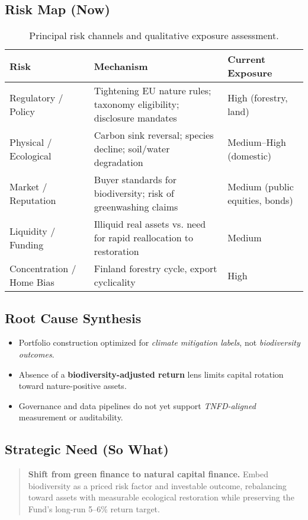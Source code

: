 \subsection*{Risk Map (Now)}
\begin{table}[h!]
\centering
\begin{tabular}{p{3.3cm} p{6.6cm} p{3.3cm}}
\toprule
\textbf{Risk} & \textbf{Mechanism} & \textbf{Current Exposure} \\
\midrule
Regulatory / Policy & Tightening EU nature rules; taxonomy eligibility; disclosure mandates & High (forestry, land) \\
Physical / Ecological & Carbon sink reversal; species decline; soil/water degradation & Medium–High (domestic) \\
Market / Reputation & Buyer standards for biodiversity; risk of greenwashing claims & Medium (public equities, bonds) \\
Liquidity / Funding & Illiquid real assets vs. need for rapid reallocation to restoration & Medium \\
Concentration / Home Bias & Finland forestry cycle, export cyclicality & High \\
\bottomrule
\end{tabular}
\caption{Principal risk channels and qualitative exposure assessment.}
\end{table}

\subsection*{Root Cause Synthesis}
\begin{itemize}[leftmargin=*, itemsep=2pt]
    \item Portfolio construction optimized for \emph{climate mitigation labels}, not \emph{biodiversity outcomes}.
    \item Absence of a \textbf{biodiversity-adjusted return} lens limits capital rotation toward nature-positive assets.
    \item Governance and data pipelines do not yet support \emph{TNFD-aligned} measurement or auditability.
\end{itemize}

\subsection*{Strategic Need (So What)}
\begin{quote}
\textbf{Shift from green finance to natural capital finance.} Embed biodiversity as a priced risk factor and investable outcome, rebalancing toward assets with measurable ecological restoration while preserving the Fund’s long-run 5–6\% return target.
\end{quote}

